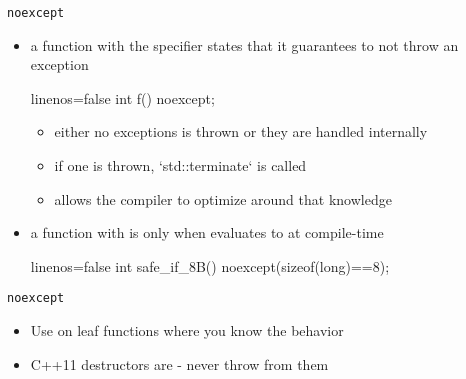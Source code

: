 \begin{frame}[fragile]
  \begin{block}{\texttt{noexcept}}
    \begin{itemize}
      \item a function with the  specifier states that it guarantees to not throw an exception
      \begin{cppcode*}{linenos=false}
        int f() noexcept;
      \end{cppcode*}
      \begin{itemize}
        \item either no exceptions is thrown or they are handled internally
        \item if one is thrown, `std::terminate` is called
        \item allows the compiler to optimize around that knowledge
      \end{itemize}
      \item a function with  is only  when  evaluates to  at compile-time
      \begin{cppcode*}{linenos=false}
        int safe_if_8B() noexcept(sizeof(long)==8);
      \end{cppcode*}
    \end{itemize}
  \end{block}
  \begin{goodpractice}{\texttt{noexcept}}
    \begin{itemize}
      \item Use  on leaf functions where you know the behavior
      \item C++11 destructors are  - never throw from them
    \end{itemize}
  \end{goodpractice}
\end{frame}

